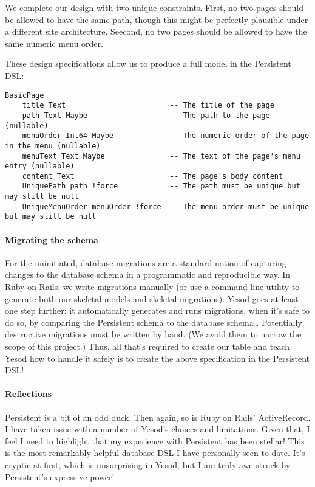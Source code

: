 We complete our design with two unique constraints. First, no two pages should be allowed to have the same path, though this might be perfectly plausible under a different site architecture. Seecond, no two pages should be allowed to have the same numeric menu order.

These design specifications allow us to produce a full model in the Persistent DSL:

\begin{Verbatim}
BasicPage
    title Text                        -- The title of the page
    path Text Maybe                   -- The path to the page (nullable)
    menuOrder Int64 Maybe             -- The numeric order of the page in the menu (nullable)
    menuText Text Maybe               -- The text of the page's menu entry (nullable)
    content Text                      -- The page's body content
    UniquePath path !force            -- The path must be unique but may still be null
    UniqueMenuOrder menuOrder !force  -- The menu order must be unique but may still be null
\end{Verbatim}

\paragraph{Migrating the schema} For the uninitiated, database migrations are a standard notion of capturing changes to the database schema in a programmatic and reproducible way. In Ruby on Rails, we write migrations manually (or use a command-line utility to generate both our skeletal models and skeletal migrations). Yesod goes at least one step further: it automatically generates and runs migrations, when it's safe to do so, by comparing the Persistent schema to the database schema \cite{ybkPersistent}. Potentially destructive migrations must be written by hand. (We avoid them to narrow the scope of this project.) Thus, all that's required to create our table and teach Yesod how to handle it safely is to create the above specification in the Persistent DSL!

\paragraph{Reflections} Persistent is a bit of an odd duck. Then again, so is Ruby on Rails' ActiveRecord. I have taken issue with a number of Yesod's choices and limitations. Given that, I feel I need to highlight that my experience with Persistent has been stellar! This is the most remarkably helpful database DSL I have personally seen to date. It's cryptic at first, which is unsurprising in Yesod, but I am truly awe-struck by Persistent's expressive power!

